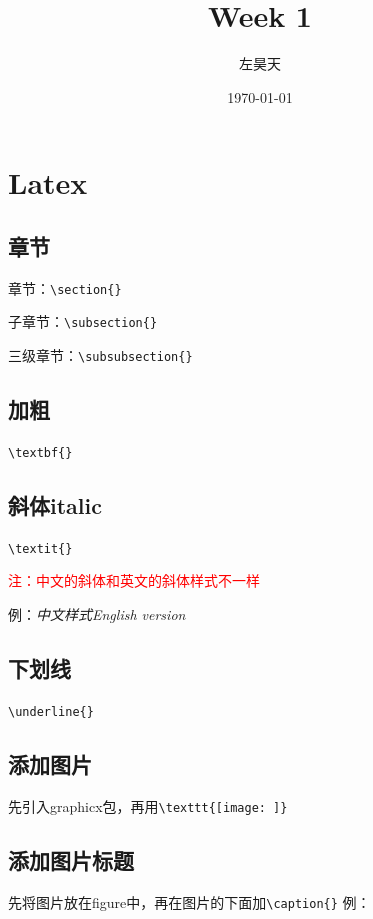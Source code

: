 \documentclass[UTF8]{ctexart}
\title{Week 1}
\author{左昊天}
\date{\today}
\begin{document}
\maketitle

\section{Latex}

\subsection{章节}
章节：\verb|\section{}|

子章节：\verb|\subsection{}|

三级章节：\verb|\subsubsection{}|

\subsection{加粗}\verb|\textbf{}|
\subsection{斜体italic}
\verb|\textit{}|  
 
\textcolor{red}{注：中文的斜体和英文的斜体样式不一样}

例：\textit{中文样式}\qquad\textit{English version}

\subsection{下划线}\verb|\underline{}|

\subsection{添加图片}
先引入graphicx包，再用\verb|\texttt{[image: ]}| 

\subsection{添加图片标题} 
先将图片放在figure中，再在图片的下面加\verb|\caption{}|
例：
\end{document}
